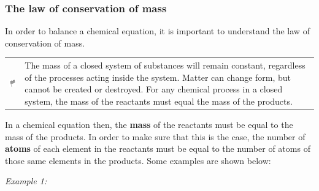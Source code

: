             \subsubsection{ The law of conservation of mass}
            \nopagebreak
        \label{m38726*id63198}In order to balance a chemical equation, it is important to understand the law of conservation of mass.\par 
\label{m38726*fhsst!!!underscore!!!id145}\begin{definition}
	  \begin{tabular*}{15 cm}{m{15 mm}m{}}
	\hspace*{-50pt}  \includegraphics[width=0.5in]{col11305.imgs/psflag2.png}   & \Definition{   \label{id2463440}\textbf{ The law of conservation of mass }} { \label{m38726*meaningfhsst!!!underscore!!!id145}
        \label{m38726*id63208}The mass of a closed system of substances will remain constant, regardless of the processes acting inside the system. Matter can change form, but cannot be created or destroyed. For any chemical process in a closed system, the mass of the reactants must equal the mass of the products. \par 
         } 
      \end{tabular*}
      \end{definition}
        \label{m38726*id63221}In a chemical equation then, the \textbf{mass} of the reactants must be equal to the mass of the products. In order to make sure that this is the case, the number of \textbf{atoms} of each element in the reactants must be equal to the number of atoms of those same elements in the products. Some examples are shown below:\par 
        \label{m38726*id63238}
          \textsl{Example 1:}
        \label{m38726*id63246}\nopagebreak\noindent{}
          
